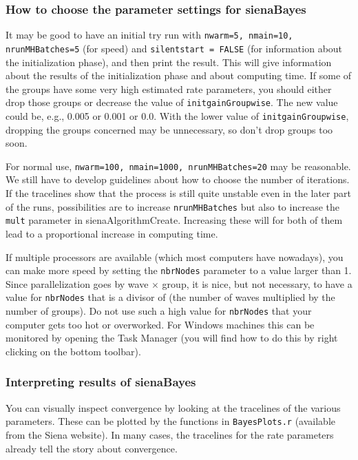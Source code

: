 \documentclass[a4paper,fleqn,11pt]{article}
\newcommand{\+}{\, + \,}
\newcommand{\sfn}[1]{\textsf{#1}}
\begin{document}
\subsubsection{How to choose the parameter settings for sienaBayes}

It may be good to have an initial try run with 
\texttt{nwarm=5, nmain=10, nrunMHBatches=5} 
(for speed) and \texttt{silentstart = FALSE} (for information about the 
initialization phase), and then \sfn{print} the result. 
This will give information about the results of the initialization 
phase and about computing time. If some of the groups have some very 
high estimated rate parameters, you should either drop those groups 
or decrease the value of \texttt{initgainGroupwise}. 
The new value could be, e.g., 0.005 or 0.001 or 0.0. With the lower value 
of \texttt{initgainGroupwise}, dropping the groups concerned may be unnecessary, 
so don't drop groups too soon.

For normal use, \texttt{nwarm=100, nmain=1000, nrunMHBatches=20}
may be reasonable. 
We still have to develop guidelines about how to choose the number of 
iterations. If the tracelines show that the process is still quite 
unstable even in the later part of the runs, possibilities are to 
increase \texttt{nrunMHBatches} but also to increase the \texttt{mult} parameter in 
\sfn{sienaAlgorithmCreate}. Increasing these will for both of them lead to 
a proportional increase in computing time. 

If multiple processors are available (which most computers have nowadays), 
you can make more speed by setting the \texttt{nbrNodes} parameter to a value 
larger than 1. Since parallelization goes by wave $\times$ group, 
it is nice, but not necessary, to have a value for \texttt{nbrNodes} that 
is a divisor of (the number of waves multiplied by the number of groups). 
Do not use such a high value for \texttt{nbrNodes} that your computer gets too
 hot or overworked. For Windows machines this can be monitored by opening 
 the Task Manager (you will find how to do this by right clicking on the bottom toolbar).

\subsubsection{Interpreting results of sienaBayes}

You can visually inspect convergence by looking at the tracelines of the 
various parameters. These can be plotted by the functions in \texttt{BayesPlots.r}
(available from the Siena website). In many cases, the tracelines for 
the rate parameters already tell the story about convergence.
\end{document}
